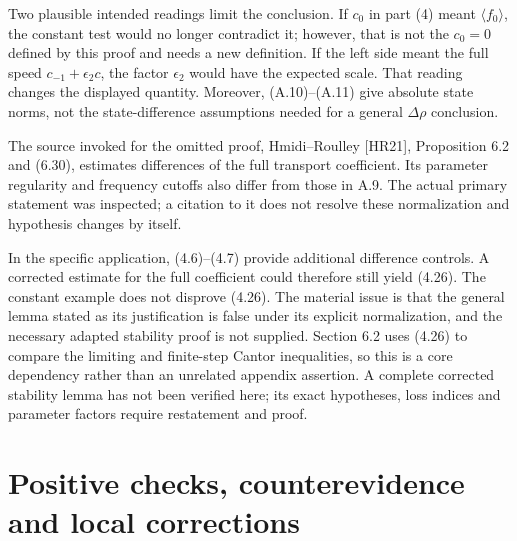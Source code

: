 \documentclass[10pt]{article}
\begin{document}
Two plausible intended readings limit the conclusion. If \(c_0\) in part (4) meant \(\langle f_0\rangle\), the constant test would no longer contradict it; however, that is not the \(c_0=0\) defined by this proof and needs a new definition. If the left side meant the full speed \(c_{-1}+\epsilon_2c\), the factor \(\epsilon_2\) would have the expected scale. That reading changes the displayed quantity. Moreover, (A.10)–(A.11) give absolute state norms, not the state-difference assumptions needed for a general \(\Delta\rho\) conclusion.\par
The source invoked for the omitted proof, Hmidi–Roulley [HR21], Proposition 6.2 and (6.30), estimates differences of the full transport coefficient. Its parameter regularity and frequency cutoffs also differ from those in A.9. The actual primary statement was inspected; a citation to it does not resolve these normalization and hypothesis changes by itself.\par
In the specific application, (4.6)–(4.7) provide additional difference controls. A corrected estimate for the full coefficient could therefore still yield (4.26). The constant example does not disprove (4.26). The material issue is that the general lemma stated as its justification is false under its explicit normalization, and the necessary adapted stability proof is not supplied. Section 6.2 uses (4.26) to compare the limiting and finite-step Cantor inequalities, so this is a core dependency rather than an unrelated appendix assertion. A complete corrected stability lemma has not been verified here; its exact hypotheses, loss indices and parameter factors require restatement and proof.\par
\section*{Positive checks, counterevidence and local corrections}
\end{document}
